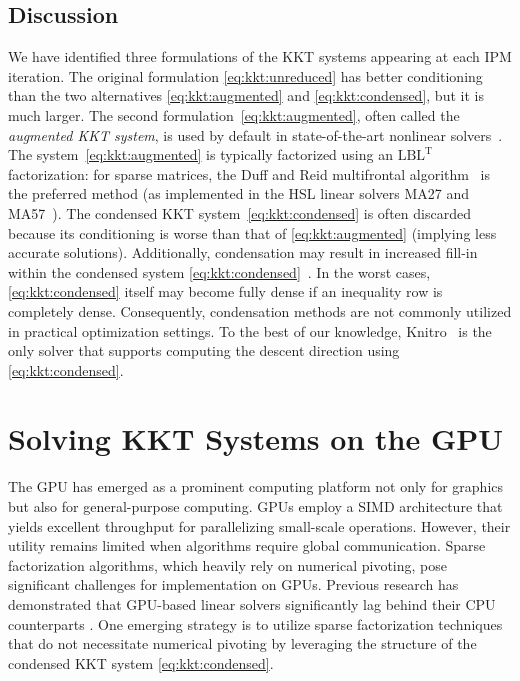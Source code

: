 \documentclass[smallextended]{svjour3}
\newcommand{\lblt}{$\mathrm{LBL^T}$\xspace}
\begin{document}
\subsection{Discussion}
We have identified three formulations of the KKT systems
appearing at each IPM iteration. The original formulation
\eqref{eq:kkt:unreduced} has better
conditioning than the two alternatives \eqref{eq:kkt:augmented} and
\eqref{eq:kkt:condensed}, but it is much larger.
The second formulation~\eqref{eq:kkt:augmented}, often called the \textit{augmented KKT system}, is
used by default in state-of-the-art nonlinear solvers~\cite{wachter2006implementation,waltz2006interior}.
The system~\eqref{eq:kkt:augmented} is typically factorized using an \lblt factorization: for sparse matrices, the Duff and Reid
multifrontal algorithm~\cite{duff1983multifrontal} is the preferred method (as implemented in the HSL linear solvers MA27 and MA57~\cite{duff2004ma57}).
The condensed KKT system~\eqref{eq:kkt:condensed} is often discarded because
its conditioning is worse
than that of \eqref{eq:kkt:augmented} (implying less accurate solutions).
Additionally, condensation may result in increased fill-in within the condensed system \eqref{eq:kkt:condensed}~\cite[Section 19.3, p.571]{nocedal_numerical_2006}.
In the worst cases, \eqref{eq:kkt:condensed} itself may become fully dense if an inequality row is completely dense.
Consequently, condensation methods are not commonly utilized in practical optimization settings.
To the best of our knowledge, Knitro~\cite{waltz2006interior} is the only solver that supports computing the descent direction using \eqref{eq:kkt:condensed}.


\section{Solving KKT Systems on the GPU}
The GPU has emerged as a prominent computing platform not only for graphics but also for general-purpose computing.
GPUs employ a SIMD architecture that yields excellent throughput for parallelizing small-scale operations.
However, their utility remains limited when algorithms require global communication.
Sparse factorization algorithms, which heavily rely on numerical pivoting, pose significant challenges for implementation on GPUs.
Previous research has demonstrated that GPU-based linear solvers significantly lag behind their CPU counterparts \cite{swirydowicz2021linear,tasseff2019exploring}.
One emerging strategy is to utilize sparse factorization techniques that do not necessitate numerical pivoting \cite{regev2023hykkt,shin2023accelerating} by leveraging the structure of the condensed KKT system \eqref{eq:kkt:condensed}.
\end{document}
